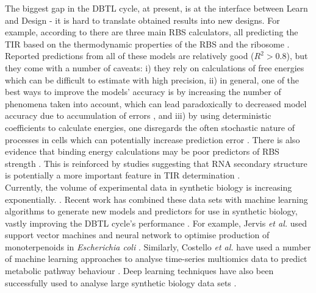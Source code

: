 \documentclass{article}
\begin{document}
The biggest gap in the DBTL cycle, at present, is at the interface between Learn and Design - it is hard to translate obtained results into new designs.
For example, according to  \textcite{Reeve2014} there are three main RBS calculators, all predicting the TIR based on the thermodynamic properties of the RBS and the ribosome \cite{Seo2013,Na2010,Salis2009,Reis2020}. 
Reported predictions from all of these models are relatively good ($R^2 >0.8$), 
but they come with a number of caveats: i) they rely on calculations of free energies which can be difficult to estimate with high precision, ii) in general, one of the best ways to improve the models' accuracy is by increasing the number of phenomena taken into account, which can lead paradoxically to decreased model accuracy due to accumulation of errors \cite{EspahBorujeni2016}, and iii) by using deterministic coefficients to calculate energies, one disregards the often stochastic nature of processes in cells which can potentially increase prediction error \cite{Goss1998}. 
There is also evidence that binding energy calculations may be poor predictors of RBS strength \cite{Saito2020,Sherer1980}. This is reinforced by studies suggesting that RNA secondary structure is potentially a more important feature in TIR determination \cite{DESMIT1994,EspahBorujeni2016}.\\

Currently, the volume of experimental data in synthetic biology is increasing exponentially. \cite{Freemont2019}. 
Recent work has combined these data sets with machine learning algorithms to generate new models and predictors for use in synthetic biology, vastly improving the DBTL cycle's performance \cite{Camacho2018,Radivojevic2020,LAWSON2021}. 
For example, Jervis \emph{et al.} used support vector machines and neural network to optimise production of monoterpenoids in \emph{Escherichia coli} \cite{Jervis2019}.
Similarly, Costello \emph{et al.} have used a number of machine learning approaches to analyse time-series multiomics data to predict metabolic pathway behaviour \cite{Costello2018}. Deep learning techniques have also been successfully used to analyse large synthetic biology data sets \cite{Alipanahi2015,Angermueller2016,Hollerer2020}.\\
\end{document}
